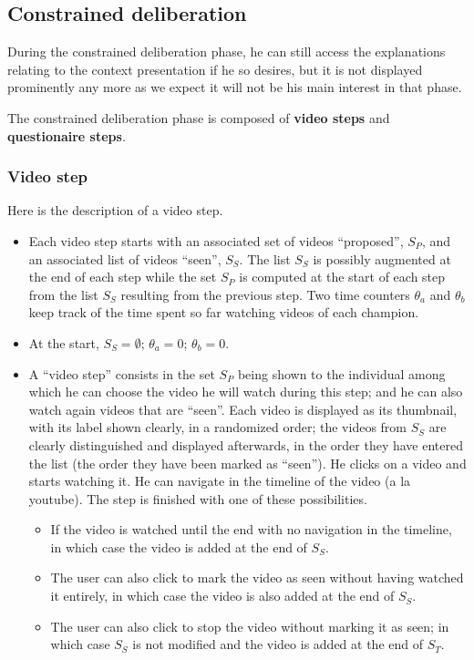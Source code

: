 \documentclass[version=3.21, pagesize, twoside=off, bibliography=totoc, DIV=calc, fontsize=12pt, a4paper]{scrartcl}
\begin{document}
\subsection{Constrained deliberation}
During the constrained deliberation phase, he can still access the explanations relating to the context presentation if he so desires, but it is not displayed prominently any more as we expect it will not be his main interest in that phase.

The constrained deliberation phase is composed of \textbf{video steps} and \textbf{questionaire steps}. 

\subsubsection{Video step}
Here is the description of a video step.
\begin{itemize}
	\item Each video step starts with an associated set of videos “proposed”, $S_P$, and an associated list of videos “seen”, $S_S$. The list $S_S$ is possibly augmented at the end of each step while the set $S_P$ is computed at the start of each step from the list $S_S$ resulting from the previous step. Two time counters $\theta_a$ and $\theta_b$ keep track of the time spent so far watching videos of each champion.
	\item At the start, $S_S = \emptyset$; $\theta_a = 0$; $\theta_b = 0$.
	\item A “video step” consists in the set $S_P$ being shown to the individual among which he can choose the video he will watch during this step; and he can also watch again videos that are “seen”. Each video is displayed as its thumbnail, with its label shown clearly, in a randomized order; the videos from $S_S$ are clearly distinguished and displayed afterwards, in the order they have entered the list (the order they have been marked as “seen”). He clicks on a video and starts watching it. 
He can navigate in the timeline of the video (a la youtube).
The step is finished with one of these possibilities.
	\begin{itemize}
		\item If the video is watched until the end with no navigation in the timeline, in which case the video is added at the end of $S_S$. 
		\item The user can also click to mark the video as seen without having watched it entirely, in which case the video is also added at the end of $S_S$.
		\item The user can also click to stop the video without marking it as seen; in which case $S_S$ is not modified and the video is added at the end of $S_T$.

\end{itemize}
\end{itemize}
\end{document}
